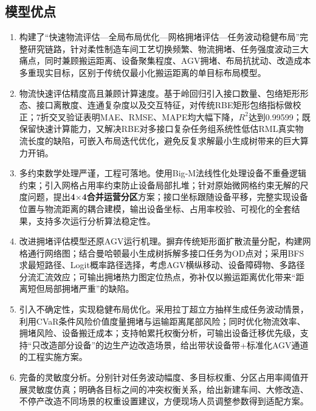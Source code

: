 \documentclass[12pt,a4paper]{article}
\begin{document}
	\subsection{模型优点}
	\begin{enumerate}
		\item 构建了“快速物流评估—全局布局优化—网格拥堵评估—任务波动稳健布局”完整研究链路，针对柔性制造车间工艺切换频繁、物流拥堵、任务强度波动三大痛点，同时兼顾搬运距离、设备聚集程度、AGV拥堵、布局抗扰动、改造成本多重现实目标，区别于传统仅最小化搬运距离的单目标布局模型。
		\item 物流快速评估精度高且兼顾计算速度。基于岭回归引入接口数量、包络矩形形态、接口离散度、连通复杂度以及交互特征，对传统RBE矩形包络指标做校正；7折交叉验证表明MAE、RMSE、MAPE均大幅下降，$R^2$达到0.99599；既保留快速计算能力，又解决RBE对多接口复杂任务组系统性低估RML真实物流长度的缺陷，可嵌入布局迭代优化，避免反复求解最小生成树带来的巨大算力开销。
		\item 多约束数学处理严谨，工程可落地。使用Big‑M法线性化处理设备不重叠逻辑约束；引入网格占用率约束防止设备局部扎堆；针对原始微网格约束无解的尺度问题，提出\textbf{4$\times$4合并运营分区}方案；接口坐标跟随设备平移，完整实现设备位置与物流距离的耦合建模，输出设备坐标、占用率校验、可视化的全套结果，支持多次运行分析算法稳定性。
		\item 改进拥堵评估模型还原AGV运行机理。摒弃传统矩形面扩散流量分配，构建网格通行网络图；结合曼哈顿最小生成树拆解多接口任务为OD点对；采用BFS求最短路径、Logit概率路径选择，考虑AGV横纵移动、设备障碍物、多路径分流汇流效应；可输出拥堵热力图定位热点，弥补仅以搬运距离优化带来“距离短但局部拥堵严重”的缺陷。
		\item 引入不确定性，实现稳健布局优化。采用拉丁超立方抽样生成任务波动情景，利用CVaR条件风险价值度量拥堵与运输距离尾部风险；同时优化物流效率、拥堵风险、设备搬迁成本；支持帕累托权衡分析，可输出设备迁移优先级，支持“只改造部分设备”的边生产边改造场景，给出带状设备带+标准化AGV通道的工程实施方案。
		\item 完备的灵敏度分析。分别针对任务波动幅度、多目标权重、分区占用率阈值开展灵敏度仿真；明确各目标之间的冲突权衡关系，给出新建车间、大修改造、不停产改造不同场景的权重设置建议，方便现场人员调整参数得到适配方案。
	\end{enumerate}
	
\end{document}
